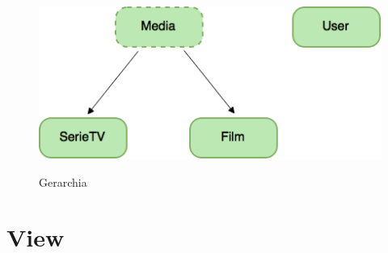 \documentclass[10pt,a4paper,openany]{article}
\begin{document}
	\begin{figure}[!h]
	\centering
	\includegraphics[angle=0,scale=.45]{G.png}\\
	\caption{Gerarchia}
	\label{fig:G}
	\end{figure}

	




\newpage

\section{View}

\end{document}
